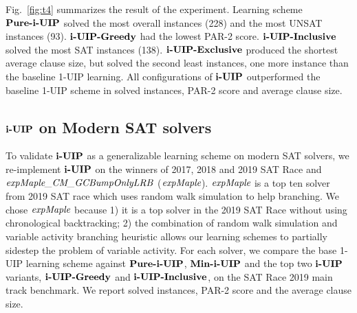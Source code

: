 Fig.~\ref{fig:t4} summarizes the result of the experiment. Learning scheme $\textbf{Pure-i-UIP}$ solved the most overall instances (228) and the most UNSAT instances (93). $\textbf{i-UIP-Greedy}$ had the lowest PAR-2 score. $\textbf{i-UIP-Inclusive}$ solved the most SAT instances (138). $\textbf{i-UIP-Exclusive}$ produced the shortest average clause size, but solved the second least instances, one more instance than the baseline 1-UIP learning. All configurations of $\textbf{i-UIP}$ outperformed the baseline 1-UIP scheme in solved instances, PAR-2 score and average clause size.


\subsection{$\textbf{i-UIP}$ on Modern SAT solvers}
To validate $\textbf{i-UIP}$ as a generalizable learning scheme on modern SAT solvers, we re-implement $\textbf{i-UIP}$ on the winners of 2017, 2018 and 2019 SAT Race\cite{} and $\textit{expMaple\_CM\_GCBumpOnlyLRB}$\cite{} ($\textit{expMaple}$). $\textit{expMaple}$ is a top ten solver from 2019 SAT race which uses random walk simulation to help branching. We chose $\textit{expMaple}$ because 1) it is a top solver in the 2019 SAT Race without using chronological backtracking; 2) the combination of random walk simulation and variable activity branching heuristic allows our learning schemes to partially sidestep the problem of variable activity. For each solver, we compare the base 1-UIP learning scheme against $\textbf{Pure-i-UIP}$, $\textbf{Min-i-UIP}$ and the top two $\textbf{i-UIP}$ variants, $\textbf{i-UIP-Greedy}$ and $\textbf{i-UIP-Inclusive}$, on the SAT Race 2019 main track benchmark. We report solved instances, PAR-2 score and the average clause size.

